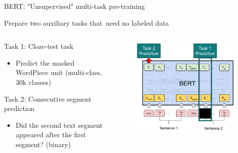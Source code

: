 \documentclass[12pt]{beamer}
\begin{document}
\begin{frame}{BERT: "Unsupervised" multi-task pre-training}

Prepare two auxiliary tasks that need no labeled data

\bigskip

\begin{columns}
	\begin{column}{0.5\linewidth}
		\begin{small}
			Task 1: Cloze-test task
			\begin{itemize}
				\item 	Predict the masked WordPiece unit (multi-class, 30k classes)
			\end{itemize}


		Task 2: Consecutive segment prediction

			\begin{itemize}
				\item Did the second text segment appeared after the first segment? (binary)
			\end{itemize}
		\end{small}
		
	\end{column}
	\begin{column}{0.5\linewidth}
		
		\begin{figure}
			\includegraphics[width=\linewidth]{img/bert-pretraining.png}
		\end{figure}
	\end{column}
	
\end{columns}
\end{frame}
\end{document}
